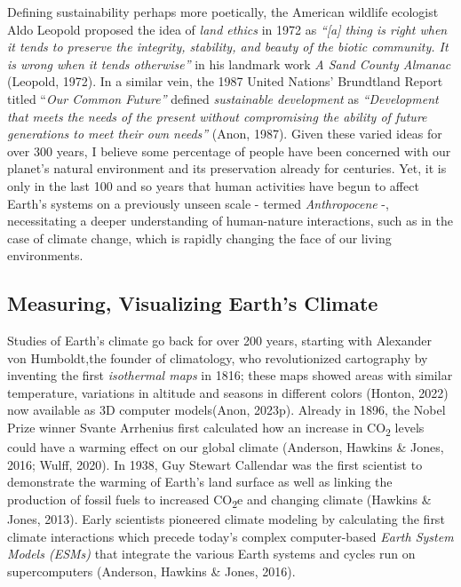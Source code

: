 \documentclass[
  letterpaper,
  DIV=11,
  numbers=noendperiod]{scrartcl}
\begin{document}
Defining sustainability perhaps more poetically, the American wildlife
ecologist Aldo Leopold proposed the idea of \emph{land ethics} in 1972
as \emph{``{[}a{]} thing is right when it tends to preserve the
integrity, stability, and beauty of the biotic community. It is wrong
when it tends otherwise''} in his landmark work \emph{A Sand County
Almanac} (Leopold, 1972). In a similar vein, the 1987 United Nations'
Brundtland Report titled ``\emph{Our Common Future''} defined
\emph{sustainable development} as \emph{``Development that meets the
needs of the present without compromising the ability of future
generations to meet their own needs''} (Anon, 1987). Given these varied
ideas for over 300 years, I believe some percentage of people have been
concerned with our planet's natural environment and its preservation
already for centuries. Yet, it is only in the last 100 and so years that
human activities have begun to affect Earth's systems on a previously
unseen scale - termed \emph{Anthropocene} -, necessitating a deeper
understanding of human-nature interactions, such as in the case of
climate change, which is rapidly changing the face of our living
environments.

\subsection{Measuring, Visualizing Earth's
Climate}\label{measuring-visualizing-earths-climate}

Studies of Earth's climate go back for over 200 years, starting with
Alexander von Humboldt,the founder of climatology, who revolutionized
cartography by inventing the first \emph{isothermal maps} in 1816; these
maps showed areas with similar temperature, variations in altitude and
seasons in different colors (Honton, 2022) now available as 3D computer
models(Anon, 2023p). Already in 1896, the Nobel Prize winner Svante
Arrhenius first calculated how an increase in CO\textsubscript{2} levels
could have a warming effect on our global climate (Anderson, Hawkins \&
Jones, 2016; Wulff, 2020). In 1938, Guy Stewart Callendar was the first
scientist to demonstrate the warming of Earth's land surface as well as
linking the production of fossil fuels to increased CO\textsubscript{2}e
and changing climate (Hawkins \& Jones, 2013). Early scientists
pioneered climate modeling by calculating the first climate interactions
which precede today's complex computer-based \emph{Earth System Models
(ESMs)} that integrate the various Earth systems and cycles run on
supercomputers (Anderson, Hawkins \& Jones, 2016).
\end{document}
